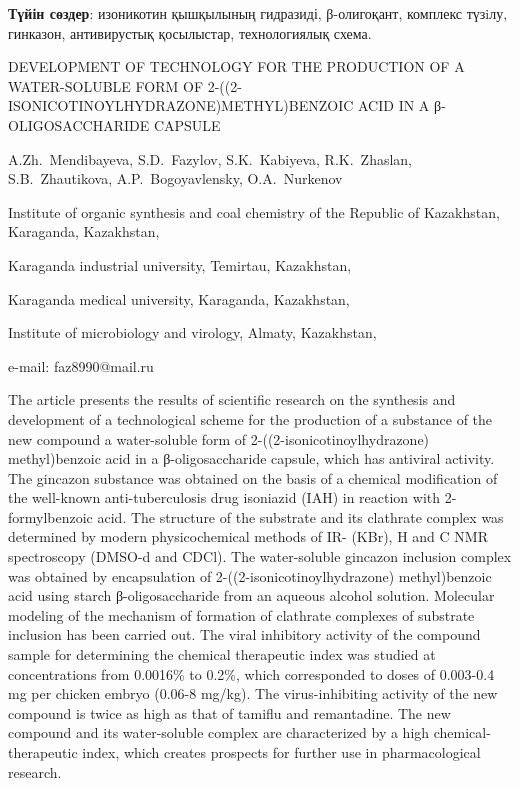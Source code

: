 {\bfseries Түйін сөздер}: изоникотин қышқылының гидразиді, β-олигоқант,
комплекс түзiлу, гинказон, антивирустық қосылыстар, технологиялық схема.

\begin{header}
DEVELOPMENT OF TECHNOLOGY FOR THE PRODUCTION OF A WATER-SOLUBLE FORM OF 2-((2-ISONICOTINOYLHYDRAZONE)METHYL)BENZOIC ACID IN A β-OLIGOSACCHARIDE CAPSULE

A.Zh.~Mendibayeva,
S.D.~Fazylov\envelope,
S.K.~Kabiyeva,
R.K.~Zhaslan,
S.B.~Zhautikova,
A.P.~Bogoyavlensky,
O.A.~Nurkenov
\end{header}

\begin{affil}
Institute of organic synthesis and coal chemistry of the Republic of Kazakhstan, Karaganda, Kazakhstan,

Karaganda industrial university, Temirtau, Kazakhstan,

Karaganda medical university, Karaganda, Kazakhstan,

Institute of microbiology and virology, Almaty, Kazakhstan,

e-mail: faz8990@mail.ru
\end{affil}

The article presents the results of scientific research on the synthesis
and development of a technological scheme for the production of a
substance of the new compound a water-soluble form of
2-((2-isonicotinoyl\-hydrazone) methyl)benzoic acid in a β-oligosaccharide
capsule, which has antiviral activity. The gincazon substance was
obtained on the basis of a chemical modification of the well-known
anti-tuberculosis drug isoniazid (IAH) in reaction with 2-formylbenzoic
acid. The structure of the substrate and its clathrate complex was
determined by modern physicochemical methods of IR- (KBr),
H and C NMR spectrosco\-py
(DMSO-d and CDCl). The water-soluble
gincazon inclusion complex was obtained by encapsulation of
2-((2-isonicotinoylhydrazone) methyl)benzoic acid using starch
β-oligosaccharide from an aqueous alcohol solution. Molecular modeling
of the mechanism of formation of clathrate complexes of substrate
inclusion has been carried out. The viral inhibitory activity of the
compound sample for determining the chemical therapeutic index was
studied at concentrations from 0.0016\% to 0.2\%, which corresponded to
doses of 0.003-0.4 mg per chicken embryo (0.06-8 mg/kg). The
virus-inhibiting activity of the new compound is twice as high as that
of tamiflu and remantadine. The new compound and its water-soluble
complex are characterized by a high chemical-therapeutic index, which
creates prospects for further use in pharmacological research.


